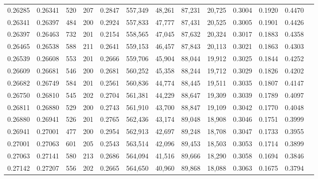 \begin{tabular}{rrrrrrrrrrrrr}
0.26285 & 0.26341 &   520 & 207 &                                     0.2847 & 557,349 &  48,261 &  87,231 &  20,725 & 0.3004 & 0.1920 & 0.4470 \\
0.26341 & 0.26397 &   484 & 200 &                                     0.2924 & 557,833 &  47,777 &  87,431 &  20,525 & 0.3005 & 0.1901 & 0.4426 \\
0.26397 & 0.26463 &   732 & 201 &                                     0.2154 & 558,565 &  47,045 &  87,632 &  20,324 & 0.3017 & 0.1883 & 0.4358 \\
0.26465 & 0.26538 &   588 & 211 &                                     0.2641 & 559,153 &  46,457 &  87,843 &  20,113 & 0.3021 & 0.1863 & 0.4303 \\
0.26539 & 0.26608 &   553 & 201 &                                     0.2666 & 559,706 &  45,904 &  88,044 &  19,912 & 0.3025 & 0.1844 & 0.4252 \\
0.26609 & 0.26681 &   546 & 200 &                                     0.2681 & 560,252 &  45,358 &  88,244 &  19,712 & 0.3029 & 0.1826 & 0.4202 \\
0.26682 & 0.26749 &   584 & 201 &                                     0.2561 & 560,836 &  44,774 &  88,445 &  19,511 & 0.3035 & 0.1807 & 0.4147 \\
0.26750 & 0.26810 &   545 & 202 &                                     0.2704 & 561,381 &  44,229 &  88,647 &  19,309 & 0.3039 & 0.1789 & 0.4097 \\
0.26811 & 0.26880 &   529 & 200 &                                     0.2743 & 561,910 &  43,700 &  88,847 &  19,109 & 0.3042 & 0.1770 & 0.4048 \\
0.26880 & 0.26941 &   526 & 201 &                                     0.2765 & 562,436 &  43,174 &  89,048 &  18,908 & 0.3046 & 0.1751 & 0.3999 \\
0.26941 & 0.27001 &   477 & 200 &                                     0.2954 & 562,913 &  42,697 &  89,248 &  18,708 & 0.3047 & 0.1733 & 0.3955 \\
0.27001 & 0.27063 &   601 & 205 &                                     0.2543 & 563,514 &  42,096 &  89,453 &  18,503 & 0.3053 & 0.1714 & 0.3899 \\
0.27063 & 0.27141 &   580 & 213 &                                     0.2686 & 564,094 &  41,516 &  89,666 &  18,290 & 0.3058 & 0.1694 & 0.3846 \\
0.27142 & 0.27207 &   556 & 202 &                                     0.2665 & 564,650 &  40,960 &  89,868 &  18,088 & 0.3063 & 0.1675 & 0.3794 \\

\end{tabular}

